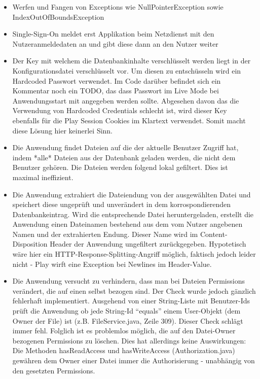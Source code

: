 \documentclass[12pt,DIV14,BCOR10mm,a4paper,parskip=half-,headsepline,headinclude,english,ngerman,bibliography=totocnumbered]{scrreprt}
\begin{document}
\begin{itemize}
  \item Werfen und Fangen von Exceptions wie NullPointerException sowie IndexOutOfBoundsException
  \item Single-Sign-On meldet erst Applikation beim Netzdienst mit den Nutzeranmeldedaten an und gibt diese dann an den Nutzer weiter
  \item Der Key mit welchem die Datenbankinhalte verschlüsselt werden liegt in der Konfigurationsdatei verschlüsselt vor. Um diesen zu entschüsseln wird ein Hardcoded Passwort verwendet. Im Code darüber befindet sich ein Kommentar noch ein TODO, das dass Passwort im Live Mode bei Anwendungsstart mit angegeben werden sollte. Abgesehen davon das die Verwendung von Hardcoded Credentials schlecht ist, wird dieser Key ebenfalls für die Play Session Cookies im Klartext verwendet. Somit macht diese Lösung hier keinerlei Sinn.
  \item Die Anwendung findet Dateien auf die der aktuelle Benutzer Zugriff hat, indem *alle* Dateien aus der Datenbank geladen werden, die nicht dem Benutzer gehören. Die Dateien werden folgend lokal gefiltert. Dies ist maximal ineffizient.
  \item Die Anwendung extrahiert die Dateiendung von der ausgewählten Datei und speichert diese ungeprüft und unverändert in dem korrospondierenden Datenbankeintrag. Wird die entsprechende Datei heruntergeladen, erstellt die Anwendung einen Dateinamen bestehend aus dem vom Nutzer angebenen Namen und der extrahierten Endung. Dieser Name wird im Content-Disposition Header der Anwendung ungefiltert zurückgegeben. Hypotetisch wäre hier ein HTTP-Response-Splitting-Angriff möglich, faktisch jedoch leider nicht - Play wirft eine Exception bei Newlines im Header-Value.
  \item Die Anwendung versucht zu verhindern, dass man bei Dateien Permissions verändert, die auf einen selbst bezogen sind. Der Check wurde jedoch gänzlich fehlerhaft implementiert. Ausgehend von einer String-Liste mit Benutzer-Ids prüft die Anwendung ob jede String-Id \enquote{equals} einem User-Objekt (dem Owner der File) ist (z.B. FileService.java, Zeile 309). Dieser Check schlägt immer fehl. Folglich ist es problemlos möglich, die auf den Datei-Owner bezogenen Permissions zu löschen. Dies hat allerdings keine Auswirkungen: Die Methoden hasReadAccess und hasWriteAccess (Authorization.java) gewähren dem Owner einer Datei immer die Authorisierung - unabhängig von den gesetzten Permissions.

\end{itemize}
\end{document}
